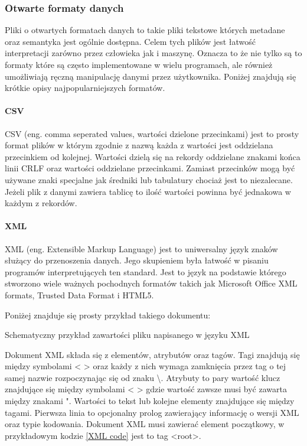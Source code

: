 \documentclass[a4paper,12pt]{article}
\begin{document}
\subsubsection{Otwarte formaty danych}

Pliki o otwartych formatach danych to takie pliki tekstowe których metadane oraz semantyka jest ogólnie dostępna. 
Celem tych plików jest łatwość interpretacji zarówno przez człowieka jak i maszynę. 
Oznacza to że nie tylko są to formaty które są często implementowane w wielu programach, ale również umożliwiają ręczną manipulację danymi przez użytkownika.  
Poniżej znajdują się krótkie opisy najpopularniejszych formatów.

\paragraph{CSV}
CSV (eng. comma seperated values, wartości dzielone przecinkami) jest to prosty format plików w którym zgodnie z nazwą każda z wartości jest oddzielana przecinkiem od kolejnej. Wartości dzielą się na rekordy oddzielane znakami końca linii CRLF oraz wartości oddzielane przecinkami. Zamiast przecinków mogą być używane znaki specjalne jak średniki lub tabulatury chociaż jest to niezalecane. Jeżeli plik z danymi zawiera tablicę to ilość wartości powinna być jednakowa w każdym z rekordów. 

\paragraph{XML}

XML (eng. Extensible Markup Language) jest to uniwersalny język znaków służący do przenoszenia danych. Jego skupieniem była łatwość w pisaniu programów interpretujących ten standard.
Jest to język na podstawie którego stworzono wiele ważnych pochodnych formatów takich jak Microsoft Office XML formats, Trusted Data Format i HTML5.

Poniżej znajduje się prosty przykład takiego dokumentu:
\begin{kod}
        
        \caption{Schematyczny przykład zawartości pliku napisanego w języku XML}
        \label{XML code}
\end{kod}

Dokument XML składa się z elementów, atrybutów oraz tagów. 
Tagi znajdują się między symbolami < > oraz każdy z nich wymaga zamknięcia przez tag o tej samej nazwie rozpoczynając się od znaku \textbackslash.
Atrybuty to pary wartość klucz znajdujące się między symbolami < > gdzie wartość zawsze musi być zawarta między znakami ".
Wartości to tekst lub kolejne elementy znajdujące się między tagami. 
Pierwsza linia to opcjonalny prolog zawierający informację o wersji XML oraz typie kodowania.  
Dokument XML musi zawierać element początkowy, w przykładowym kodzie \ref{XML code} jest to tag <root>.
\end{document}
